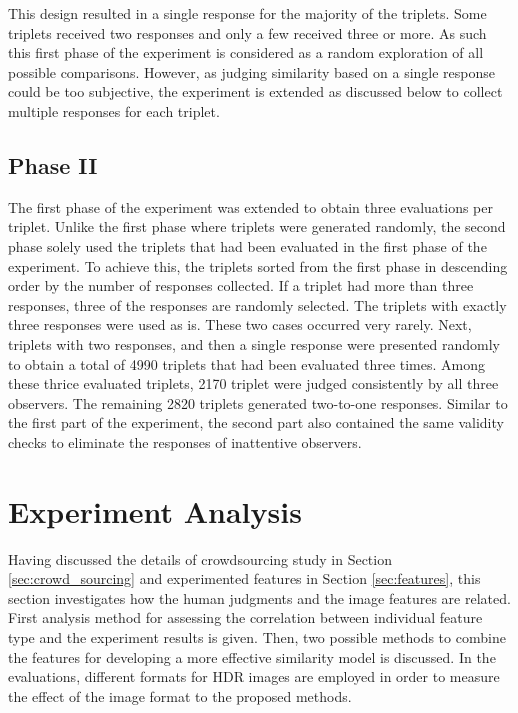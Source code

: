 This design resulted in a single response for the majority of the triplets. Some triplets received two responses and only a few received three or more. As such this first phase of the experiment is considered as a random exploration of all possible comparisons. However, as judging similarity based on a single response could be too subjective, the experiment is extended as discussed below to collect multiple responses for each triplet.

\subsection{Phase II}
\label{sec:exp_phase_II}
The first phase of the experiment was extended to obtain three evaluations per triplet. Unlike the first phase where triplets were generated randomly, the second phase solely used the triplets that had been evaluated in the first phase of the experiment. To achieve this, the triplets sorted from the first phase in descending order by the number of responses collected. If a triplet had more than three responses, three of the responses are randomly selected. The triplets with exactly three responses were used as is. These two cases occurred very rarely. Next, triplets with two responses, and then a single response were presented randomly to obtain a total of 4990 triplets that had been evaluated three times. Among these thrice evaluated triplets, 2170 triplet were judged consistently by all three observers. The remaining 2820 triplets generated two-to-one responses. Similar to the first part of the experiment, the second part also contained the same validity checks to eliminate the responses of inattentive observers.

\section{Experiment Analysis}

Having discussed the details of crowdsourcing study in Section \ref{sec:crowd_sourcing} and experimented features in Section \ref{sec:features}, this section investigates how the human judgments and the image features are related. First analysis method for assessing the correlation between individual feature type and the experiment results is given. Then, two possible methods to combine the features for developing a more effective similarity model is discussed. In the evaluations, different formats for HDR images are employed in order to measure the effect of the image format to the proposed methods. 

